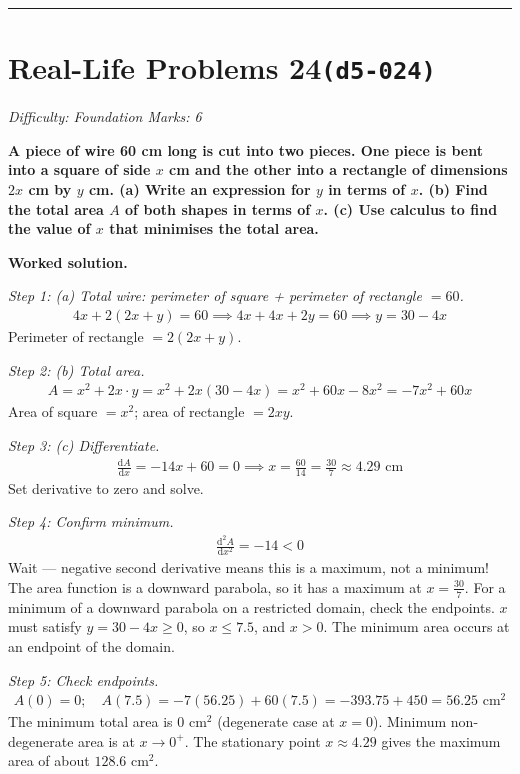 \documentclass[11pt]{article}
\newcommand{\question}[1]{\par\medskip\noindent\textbf{#1}\par}
\begin{document}
\medskip\hrule

\section*{Real-Life Problems 24\quad\small\texttt{(d5-024)}}
\textit{Difficulty: Foundation \quad\textbar\quad Marks: 6}

\question{A piece of wire 60 cm long is cut into two pieces. One piece is bent into a square of side \( x \) cm and the other into a rectangle of dimensions \( 2x \) cm by \( y \) cm. (a) Write an expression for \( y \) in terms of \( x \). (b) Find the total area \( A \) of both shapes in terms of \( x \). (c) Use calculus to find the value of \( x \) that minimises the total area.}

\textbf{Worked solution.}

\textit{Step 1: (a) Total wire: perimeter of square + perimeter of rectangle \( = 60 \).}
\[\begin{gathered}
4x + 2(2x + y) = 60 \implies 4x + 4x + 2y = 60 \implies y = 30 - 4x
\end{gathered}\]
Perimeter of rectangle \( = 2(2x + y) \).

\textit{Step 2: (b) Total area.}
\[\begin{gathered}
A = x^2 + 2x \cdot y = x^2 + 2x(30 - 4x) = x^2 + 60x - 8x^2 = -7x^2 + 60x
\end{gathered}\]
Area of square \( = x^2 \); area of rectangle \( = 2xy \).

\textit{Step 3: (c) Differentiate.}
\[\begin{gathered}
\frac{\mathrm{d}A}{\mathrm{d}x} = -14x + 60 = 0 \implies x = \frac{60}{14} = \frac{30}{7} \approx 4.29 \text{ cm}
\end{gathered}\]
Set derivative to zero and solve.

\textit{Step 4: Confirm minimum.}
\[\begin{gathered}
\frac{\mathrm{d}^2A}{\mathrm{d}x^2} = -14 < 0
\end{gathered}\]
Wait --- negative second derivative means this is a maximum, not a minimum! The area function is a downward parabola, so it has a maximum at \( x = \tfrac{30}{7} \). For a minimum of a downward parabola on a restricted domain, check the endpoints. \( x \) must satisfy \( y = 30 - 4x \geq 0 \), so \( x \leq 7.5 \), and \( x > 0 \). The minimum area occurs at an endpoint of the domain.

\textit{Step 5: Check endpoints.}
\[\begin{gathered}
A(0) = 0; \quad A(7.5) = -7(56.25) + 60(7.5) = -393.75 + 450 = 56.25 \text{ cm}^2
\end{gathered}\]
The minimum total area is 0 cm\(^2\) (degenerate case at \(x = 0\)). Minimum non-degenerate area is at \( x \to 0^+ \). The stationary point \( x \approx 4.29 \) gives the maximum area of about \( 128.6 \text{ cm}^2 \).
\end{document}
